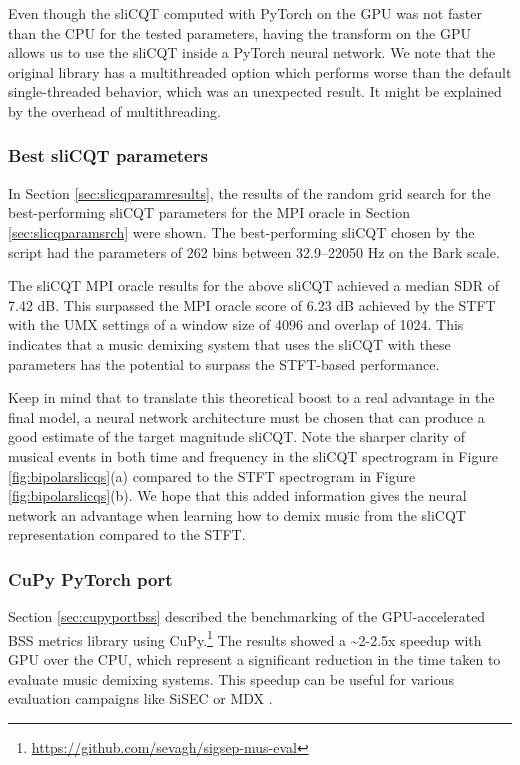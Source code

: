 \documentclass[report.tex]{subfiles}
\begin{document}
Even though the sliCQT computed with PyTorch on the GPU was not faster than the CPU for the tested parameters, having the transform on the GPU allows us to use the sliCQT inside a PyTorch neural network. We note that the original library has a multithreaded option which performs worse than the default single-threaded behavior, which was an unexpected result. It might be explained by the overhead of multithreading.

\subsubsection{Best sliCQT parameters}
\label{sec:slicqparamresultsdiscuss}

In Section \ref{sec:slicqparamresults}, the results of the random grid search for the best-performing sliCQT parameters for the MPI oracle in Section \ref{sec:slicqparamsrch} were shown. The best-performing sliCQT chosen by the script had the parameters of 262 bins between 32.9--22050 Hz on the Bark scale.

The sliCQT MPI oracle results for the above sliCQT achieved a median SDR of 7.42 dB. This surpassed the MPI oracle score of 6.23 dB achieved by the STFT with the UMX settings of a window size of 4096 and overlap of 1024. This indicates that a music demixing system that uses the sliCQT with these parameters has the potential to surpass the STFT-based performance.

Keep in mind that to translate this theoretical boost to a real advantage in the final model, a neural network architecture must be chosen that can produce a good estimate of the target magnitude sliCQT. Note the sharper clarity of musical events in both time and frequency in the sliCQT spectrogram in Figure \ref{fig:bipolarslicqs}(a) compared to the STFT spectrogram in Figure \ref{fig:bipolarslicqs}(b). We hope that this added information gives the neural network an advantage when learning how to demix music from the sliCQT representation compared to the STFT.

\subsubsection{CuPy PyTorch port}
\label{sec:cupyportbssdiscuss}

Section \ref{sec:cupyportbss} described the benchmarking of the GPU-accelerated BSS metrics library using CuPy.\footnote{\url{https://github.com/sevagh/sigsep-mus-eval}} The results showed a \textasciitilde2-2.5x speedup with GPU over the CPU, which represent a significant reduction in the time taken to evaluate music demixing systems. This speedup can be useful for various evaluation campaigns like SiSEC \parencite{sisec2018} or MDX \parencite{mdx21}.
\end{document}
